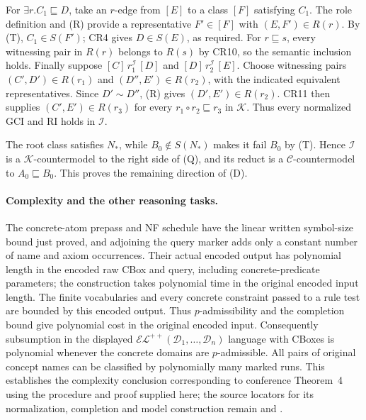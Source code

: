 For \(\exists r.C_1\sqsubseteq D\), take an \(r\)-edge from \([E]\)
to a class \([F]\) satisfying \(C_1\).
The role definition and (R) provide a representative \(F'\in[F]\)
with \((E,F')\in R(r)\).  By (T), \(C_1\in S(F')\);
CR4 gives \(D\in S(E)\), as required.
For \(r\sqsubseteq s\), every witnessing pair in \(R(r)\) belongs to
\(R(s)\) by CR10, so the semantic inclusion holds.
Finally suppose \([C]\,r_1^{\mathcal I}\,[D]\) and
\([D]\,r_2^{\mathcal I}\,[E]\).
Choose witnessing pairs \((C',D')\in R(r_1)\) and
\((D'',E')\in R(r_2)\), with the indicated equivalent representatives.
Since \(D'\sim D''\), (R) gives \((D',E')\in R(r_2)\).
CR11 then supplies \((C',E')\in R(r_3)\) for every
\(r_1\circ r_2\sqsubseteq r_3\) in \(\mathcal K\).
Thus every normalized GCI and RI holds in \(\mathcal I\).

The root class satisfies \(N_\ast\), while \(B_0\notin S(N_\ast)\)
makes it fail \(B_0\) by (T).  Hence \(\mathcal I\) is a
\(\mathcal K\)-countermodel to the right side of (Q), and its reduct
is a \(\mathcal C\)-countermodel to \(A_0\sqsubseteq B_0\).
This proves the remaining direction of (D).

\paragraph{Complexity and the other reasoning tasks.}
The concrete-atom prepass and NF schedule have the linear written symbol-size
bound just proved, and adjoining the query marker adds only a constant number
of name and axiom occurrences.  Their actual encoded output has polynomial
length in the encoded raw CBox and query, including concrete-predicate
parameters; the construction takes polynomial time in the original encoded
input length.
The finite vocabularies and every concrete constraint passed to a rule test
are bounded by this encoded output.  Thus \(p\)-admissibility and the
completion bound give polynomial cost in the original encoded input.
Consequently subsumption in the displayed
\(\mathcal{EL}^{++}(\mathcal D_1,\ldots,\mathcal D_n)\) language with
CBoxes is polynomial whenever the concrete domains are \(p\)-admissible.
All pairs of original concept names can be classified by polynomially many marked
runs.  This establishes the complexity conclusion corresponding to conference
Theorem~4 using the procedure and proof supplied here; the source locators for
its normalization, completion and model construction remain
\cite[lems.~1--3 and thm.~4]{BaaderBrandtLutz2005}
and \cite[\S3.1, lems.~5--7 and thm.~8]{BaaderBrandtLutz2005TR}.


